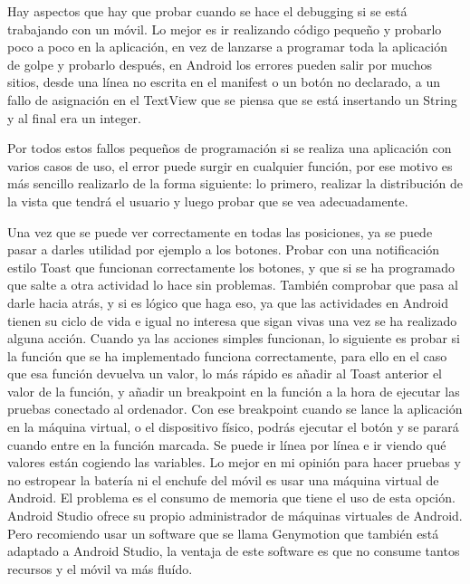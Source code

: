 Hay aspectos que hay que probar cuando se hace el debugging si se está trabajando con un móvil. Lo mejor es ir realizando código pequeño y probarlo poco a poco en la aplicación, en vez de lanzarse a programar toda la aplicación de golpe y probarlo después, en Android los errores pueden salir por muchos sitios, desde una línea no escrita en el manifest o un botón no declarado, a un fallo de asignación en el TextView que se piensa que se está insertando un String y al final era un integer.

Por todos estos fallos pequeños de programación si se realiza una aplicación con varios casos de uso, el error puede surgir en cualquier función, por ese motivo es más sencillo realizarlo de la forma siguiente: lo primero, realizar la distribución de la vista que tendrá el usuario y luego probar que se vea adecuadamente.

Una vez que se puede ver correctamente en todas las posiciones, ya se puede pasar a darles utilidad por ejemplo a los botones. Probar con una notificación estilo Toast que funcionan correctamente los botones, y que si se ha programado que salte a otra actividad lo hace sin problemas. También comprobar que pasa al darle hacia atrás, y si es lógico que haga eso, ya que las actividades en Android tienen su ciclo de vida e igual no interesa que sigan vivas una vez se ha realizado alguna acción.
Cuando ya las acciones simples funcionan, lo siguiente es probar si la función que se ha implementado funciona correctamente, para ello en el caso que esa función devuelva un valor, lo más rápido es añadir al Toast anterior el valor de la función, y añadir un breakpoint en la función a la hora de ejecutar las pruebas conectado al ordenador.
Con ese breakpoint cuando se lance la aplicación en la máquina virtual, o el dispositivo físico, podrás ejecutar el botón y se parará cuando entre en la función marcada. Se puede ir línea por línea e ir viendo qué valores están cogiendo las variables.
Lo mejor en mi opinión para hacer pruebas y no estropear la batería ni el enchufe del móvil es usar una máquina virtual de Android. El problema es el consumo de memoria que tiene el uso de esta opción. Android Studio ofrece su propio administrador de máquinas virtuales de Android. Pero recomiendo usar un software que se llama Genymotion que también está adaptado a Android Studio, la ventaja de este software es que no consume tantos recursos y el móvil va más fluído.

